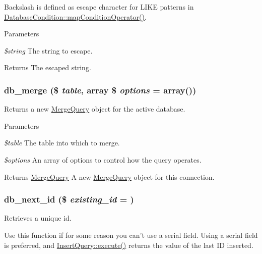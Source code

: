 Backslash is defined as escape character for LIKE patterns in \hyperlink{classDatabaseCondition_afb4e820b6d1719bf940526beef27dc7a}{DatabaseCondition::mapConditionOperator()}.


\begin{DoxyParams}{Parameters}
\item[{\em \$string}]The string to escape.\end{DoxyParams}
\begin{DoxyReturn}{Returns}
The escaped string. 
\end{DoxyReturn}
\hypertarget{group__database_ga429c73a1bdc6dbb18c4a4a8a2235beaf}{
\subsubsection[{db\_\-merge}]{\setlength{\rightskip}{0pt plus 5cm}db\_\-merge (\$ {\em table}, \/  array \$ {\em options} = {\ttfamily array()})}}
\label{group__database_ga429c73a1bdc6dbb18c4a4a8a2235beaf}
Returns a new \hyperlink{classMergeQuery}{MergeQuery} object for the active database.


\begin{DoxyParams}{Parameters}
\item[{\em \$table}]The table into which to merge. \item[{\em \$options}]An array of options to control how the query operates.\end{DoxyParams}
\begin{DoxyReturn}{Returns}
\hyperlink{classMergeQuery}{MergeQuery} A new \hyperlink{classMergeQuery}{MergeQuery} object for this connection. 
\end{DoxyReturn}
\hypertarget{group__database_gab0a2cb3e94525a74407740043b821c5b}{
\subsubsection[{db\_\-next\_\-id}]{\setlength{\rightskip}{0pt plus 5cm}db\_\-next\_\-id (\$ {\em existing\_\-id} = {})}}
\label{group__database_gab0a2cb3e94525a74407740043b821c5b}
Retrieves a unique id.

Use this function if for some reason you can't use a serial field. Using a serial field is preferred, and \hyperlink{classInsertQuery_a9bcd2f989e2ae0173bd6f58b6ede12fc}{InsertQuery::execute()} returns the value of the last ID inserted.



